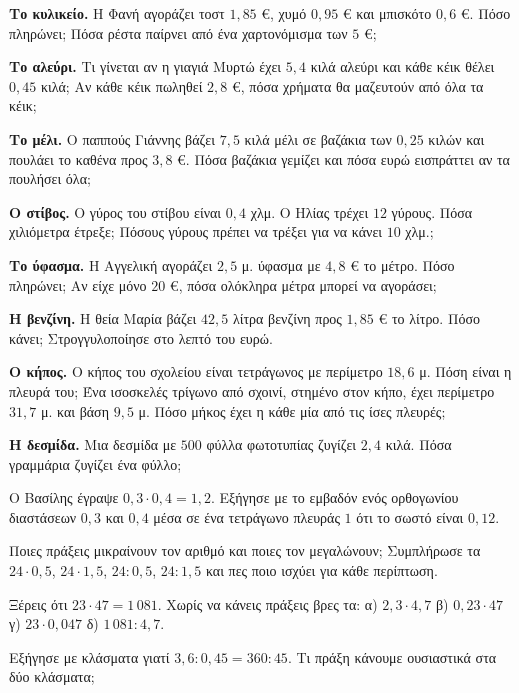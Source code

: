 \ex \textbf{Το κυλικείο.} Η Φανή αγοράζει τοστ $1{,}85$ €, χυμό $0{,}95$ € και μπισκότο $0{,}6$ €. Πόσο πληρώνει; Πόσα ρέστα παίρνει από ένα χαρτονόμισμα των $5$ €;

\ex \textbf{Το αλεύρι.} Τι γίνεται αν η γιαγιά Μυρτώ έχει $5{,}4$ κιλά αλεύρι και κάθε κέικ θέλει $0{,}45$ κιλά; Αν κάθε κέικ πωληθεί $2{,}8$ €, πόσα χρήματα θα μαζευτούν από όλα τα κέικ;

\ex \textbf{Το μέλι.} Ο παππούς Γιάννης βάζει $7{,}5$ κιλά μέλι σε βαζάκια των $0{,}25$ κιλών και πουλάει το καθένα προς $3{,}8$ €. Πόσα βαζάκια γεμίζει και πόσα ευρώ εισπράττει αν τα πουλήσει όλα;

\ex \textbf{Ο στίβος.} Ο γύρος του στίβου είναι $0{,}4$ χλμ. Ο Ηλίας τρέχει $12$ γύρους. Πόσα χιλιόμετρα έτρεξε; Πόσους γύρους πρέπει να τρέξει για να κάνει $10$ χλμ.;

\ex \textbf{Το ύφασμα.} Η Αγγελική αγοράζει $2{,}5$ μ. ύφασμα με $4{,}8$ € το μέτρο. Πόσο πληρώνει; Αν είχε μόνο $20$ €, πόσα ολόκληρα μέτρα μπορεί να αγοράσει;

\ex \textbf{Η βενζίνη.} Η θεία Μαρία βάζει $42{,}5$ λίτρα βενζίνη προς $1{,}85$ € το λίτρο. Πόσο κάνει; Στρογγυλοποίησε στο λεπτό του ευρώ.

\ex \textbf{Ο κήπος.} Ο κήπος του σχολείου είναι τετράγωνος με περίμετρο $18{,}6$ μ. Πόση είναι η πλευρά του; Ένα ισοσκελές τρίγωνο από σχοινί, στημένο στον κήπο, έχει περίμετρο $31{,}7$ μ. και βάση $9{,}5$ μ. Πόσο μήκος έχει η κάθε μία από τις ίσες πλευρές;

\ex \textbf{Η δεσμίδα.} Μια δεσμίδα με $500$ φύλλα φωτοτυπίας ζυγίζει $2{,}4$ κιλά. Πόσα γραμμάρια ζυγίζει ένα φύλλο;


\ex Ο Βασίλης έγραψε $0{,}3\cdot0{,}4=1{,}2$. Εξήγησε με το εμβαδόν ενός ορθογωνίου διαστάσεων $0{,}3$ και $0{,}4$ μέσα σε ένα τετράγωνο πλευράς $1$ ότι το σωστό είναι $0{,}12$.

\ex Ποιες πράξεις μικραίνουν τον αριθμό και ποιες τον μεγαλώνουν; Συμπλήρωσε τα $24\cdot0{,}5$, $24\cdot1{,}5$, $24:0{,}5$, $24:1{,}5$ και πες ποιο ισχύει για κάθε περίπτωση.

\ex Ξέρεις ότι $23\cdot47=1\,081$. Χωρίς να κάνεις πράξεις βρες τα: α) $2{,}3\cdot4{,}7$ \quad β) $0{,}23\cdot47$ \quad γ) $23\cdot0{,}047$ \quad δ) $1\,081:4{,}7$.

\ex Εξήγησε με κλάσματα γιατί $3{,}6:0{,}45=360:45$. Τι πράξη κάνουμε ουσιαστικά στα δύο κλάσματα;

